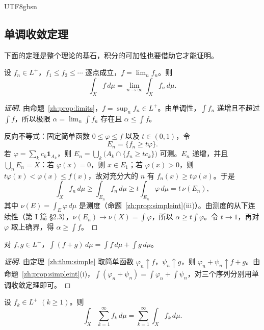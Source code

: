 \documentclass[11pt]{article}
\makeatletter
\newcommand{\envlabel}[1]{\protected@edef\@currentlabel{\themathenv}\label{#1}}
\makeatother
\begin{document}
\begin{CJK*}{UTF8}{gbsn}
\subsection{单调收敛定理}

下面的定理是整个理论的基石，积分的可加性也要借助它才能证明。

\begin{theorem}[单调收敛定理]\envlabel{zh:thm:mct}
设 $f_{n}\in L^{+}$，$f_{1}\leq f_{2}\leq\cdots$ 逐点成立，$f=\lim_{n}f_{n}$。则
\[
\int_{X}f\,d\mu=\lim_{n\to\infty}\int_{X}f_{n}\,d\mu.
\]
\end{theorem}

\begin{proof}[证明]
由命题~\ref{zh:prop:limits}，$f=\sup_{n}f_{n}\in L^{+}$。由单调性，$\int f_{n}$ 递增且不超过 $\int f$，所以极限 $\alpha=\lim_{n}\int f_{n}$ 存在且 $\alpha\leq\int f$。

反向不等式：固定简单函数 $0\leq\varphi\leq f$ 以及 $t\in(0,1)$，令
\[
E_{n}=\{f_{n}\geq t\varphi\}.
\]
若 $\varphi=\sum_{k}c_{k}\mathbf{1}_{A_{k}}$，则 $E_{n}=\bigcup_{k}\big(A_{k}\cap\{f_{n}\geq tc_{k}\}\big)$ 可测。$E_{n}$ 递增，并且 $\bigcup_{n}E_{n}=X$：若 $\varphi(x)=0$，则 $x\in E_{1}$；若 $\varphi(x)>0$，则 $t\varphi(x)<\varphi(x)\leq f(x)$，故对充分大的 $n$ 有 $f_{n}(x)\geq t\varphi(x)$。于是
\[
\int_{X}f_{n}\,d\mu\geq\int_{E_{n}}f_{n}\,d\mu\geq t\int_{E_{n}}\varphi\,d\mu=t\,\nu(E_{n}),
\]
其中 $\nu(E)=\int_{E}\varphi\,d\mu$ 是测度（命题~\ref{zh:prop:simpleint}(iii)）。由测度的从下连续性（第 I 篇 \S2.3），$\nu(E_{n})\to\nu(X)=\int\varphi$，所以 $\alpha\geq t\int\varphi$。令 $t\to1$，再对 $\varphi$ 取上确界，得 $\alpha\geq\int f$。
\end{proof}

\begin{corollary}[可加性]\envlabel{zh:cor:add}
对 $f,g\in L^{+}$，$\int(f+g)\,d\mu=\int f\,d\mu+\int g\,d\mu$。
\end{corollary}

\begin{proof}[证明]
由定理~\ref{zh:thm:simple} 取简单函数 $\varphi_{n}\uparrow f$，$\psi_{n}\uparrow g$，则 $\varphi_{n}+\psi_{n}\uparrow f+g$。由命题~\ref{zh:prop:simpleint}(i)，$\int(\varphi_{n}+\psi_{n})=\int\varphi_{n}+\int\psi_{n}$，对三个序列分别用单调收敛定理即可。
\end{proof}

\begin{corollary}[逐项积分]\envlabel{zh:cor:series}
设 $f_{k}\in L^{+}$ $(k\geq1)$。则
\[
\int_{X}\sum_{k=1}^{\infty}f_{k}\,d\mu=\sum_{k=1}^{\infty}\int_{X}f_{k}\,d\mu.
\]
\end{corollary}


\end{CJK*}
\end{document}
